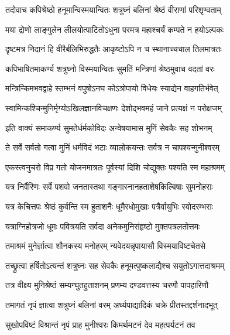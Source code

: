 \twolineshloka
{तदोवाच कपिश्रेष्ठो हनूमान्विस्मयान्वितः}
{शत्रुघ्नं बलिनां श्रेष्ठं वीराणां परिशृण्वताम्}%

\twolineshloka
{मया द्रोणो लाङ्गुलेन लीलयोत्पाटितोऽधुना}
{परमत्र महाश्चर्यं कम्पते न हयोऽल्पकः}%

\twolineshloka
{दृष्टमत्र निदानं हि वीरैर्बलिभिरुद्धतैः}
{आकृष्टोऽपि न च स्थानाच्चचाल तिलमात्रतः}%

\twolineshloka
{कपिभाषितमाकर्ण्य शत्रुघ्नो विस्मयान्वितः}
{सुमतिं मन्त्रिणां श्रेष्ठमुवाच वदतां वरः}%


\twolineshloka
{मन्त्रिन्किमभवद्वाहे स्तम्भनं वपुषोऽनघ}
{कोऽत्रोपायो विधेयः स्याद्येन वाहगतिर्भवेत्}%


\twolineshloka
{स्वामिन्कश्चिन्मुनिर्मृग्योऽखिलज्ञानविचक्षणः}
{देशोद्भवमहं जाने प्रत्यक्षं न परोक्षजम्}%


\twolineshloka
{इति वाक्यं समाकर्ण्य सुमतेर्धर्मकोविदः}
{अन्वेषयामास मुनिं सेवकैः सह शोभनम्}%

\twolineshloka
{ते सर्वे सर्वतो गत्वा मुनिं धर्मविदं भटाः}
{व्यालोकयन्तः सर्वत्र न चापश्यन्मुनीश्वरम्}%

\twolineshloka
{एकस्त्वनुचरो विप्र गतो योजनमात्रतः}
{पूर्वस्यां दिशि चोद्युक्तः पश्यति स्म महाश्रमम्}%

\twolineshloka
{यत्र निर्वैरिणः सर्वे पशवो जनतास्तथा}
{गङ्गास्नानहताशेषकिल्बिषाः सुमनोहराः}%

\twolineshloka
{यत्र केचित्तपः श्रेष्ठं कुर्वन्ति स्म हुताशनैः}
{धूमैरधोमुखाः पत्रैर्वायुभिः स्वोदरम्भराः}%

\twolineshloka
{यत्राग्निहोत्रजो धूमः पवित्रयति सर्वदा}
{अनेकमुनिसंहृष्टो मुक्तपत्रलतोत्तमः}%

\twolineshloka
{तमाश्रमं मुनेर्ज्ञात्वा शौनकस्य मनोहरम्}
{न्यवेदयन्नृपायासौ विस्मयाविष्टचेतसे}%

\twolineshloka
{तच्छ्रुत्वा हर्षितोऽत्यन्तं शत्रुघ्नः सह सेवकैः}
{हनूमत्पुष्कलाद्यैश्च सयुतोऽगात्तदाश्रमम्}%

\twolineshloka
{तत्र वीक्ष्य मुनिश्रेष्ठं सम्यग्घुतहुताशनम्}
{प्रणम्य दण्डवत्तस्य चरणौ पापहारिणौ}%

\twolineshloka
{तमागतं नृपं ज्ञात्वा शत्रुघ्नं बलिनां वरम्}
{अर्घ्यपाद्यादिकं चक्रे प्रीतस्तद्दर्शनादभूत्}%

\twolineshloka
{सुखोपविष्टं विश्रान्तं नृपं प्राह मुनीश्वरः}
{किमर्थमटनं देव महत्पर्यटनं तव}%

